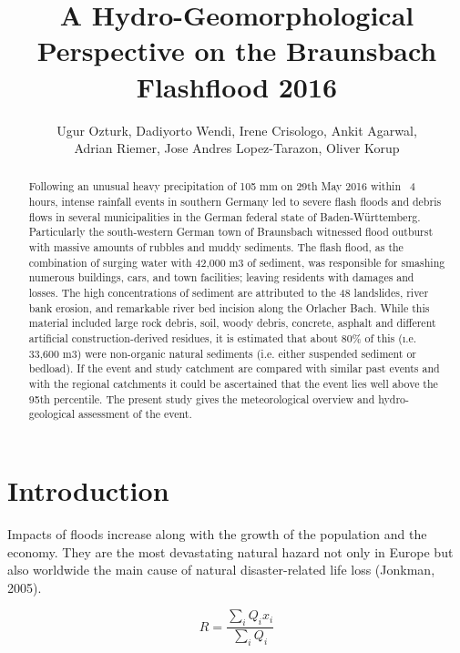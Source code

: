 \documentclass[10pt]{article}
\begin{document}
\title{A Hydro-Geomorphological Perspective on the Braunsbach Flashflood 2016}
\author{Ugur Ozturk, Dadiyorto Wendi, Irene Crisologo, Ankit Agarwal, \\
Adrian Riemer, Jose Andres Lopez-Tarazon, Oliver Korup}
\date{}

\maketitle


\begin{abstract}

Following an unusual heavy precipitation of 105 mm on 29th May 2016 within ~4 hours, intense rainfall events in southern Germany led to severe flash floods and debris flows in several municipalities in the German federal state of Baden-W{\"u}rttemberg. Particularly the south-western German town of Braunsbach witnessed flood outburst with massive amounts of rubbles and muddy sediments. The flash flood, as the combination of surging water with 42,000 m3 of sediment, was responsible for smashing numerous buildings, cars, and town facilities; leaving residents with damages and losses. The high concentrations of sediment are attributed to the 48 landslides, river bank erosion, and remarkable river bed incision along the Orlacher Bach.  While this material included large rock debris, soil, woody debris, concrete, asphalt and different artificial construction-derived residues, it is estimated that about 80\% of this (\i.e. 33,600 m3) were non-organic natural sediments (i.e. either suspended sediment or bedload). If the event and study catchment are compared with similar past events and with the regional catchments it could be ascertained that the event lies well above the 95th percentile. The present study gives the meteorological overview and hydro-geological assessment of the event.

\end{abstract}

\section{Introduction}

Impacts of floods increase along with the growth of the population and the economy. They are the most devastating natural hazard not only in Europe but also worldwide the main cause of natural disaster-related life loss (Jonkman, 2005).

\begin{equation}
R=\frac{\sum_{i} Q_{i} x_i}{\sum_{i} Q_i}
\end{equation}
\end{document}
